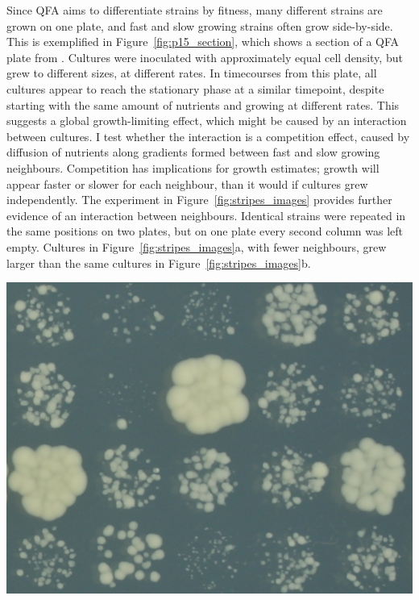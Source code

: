 Since QFA aims to differentiate strains by fitness, many different
strains are grown on one plate, and fast and slow growing strains
often grow side-by-side. This is exemplified in
Figure~\ref{fig:p15_section}, which shows a section of a QFA plate
from \citet{Addinall2011}. Cultures were inoculated with approximately
equal cell density, but grew to different sizes, at different
rates. In timecourses from this plate, all cultures appear to reach
the stationary phase at a similar timepoint, despite starting with the
same amount of nutrients and growing at different rates. This suggests
a global growth-limiting effect, which might be caused by an
interaction between cultures. I test whether the interaction is a
competition effect, caused by diffusion of nutrients along gradients
formed between fast and slow growing neighbours. Competition has
implications for growth estimates; growth will appear faster or slower
for each neighbour, than it would if cultures grew independently. The
experiment in Figure~\ref{fig:stripes_images} provides further
evidence of an interaction between neighbours. Identical strains were
repeated in the same positions on two plates, but on one plate every
second column was left empty. Cultures in
Figure~\ref{fig:stripes_images}a, with fewer neighbours, grew larger
than the same cultures in Figure~\ref{fig:stripes_images}b.

\begin{Figure}
  \centering
  \includegraphics[width=\linewidth]{p15_section/p15_section_4x5_5_18}
  \label{fig:p15_section}
\end{Figure}

